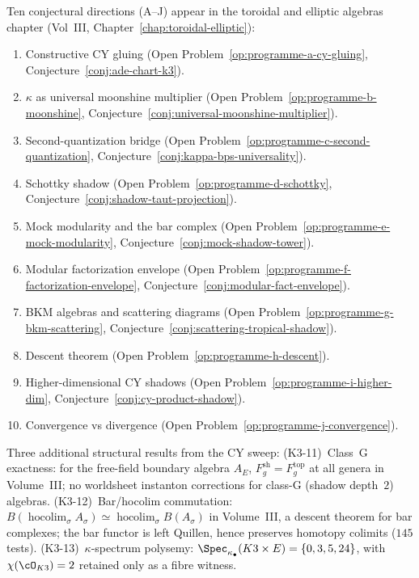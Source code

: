 \begin{enumerate}[resume, label=\textup{(\arabic*)}]
 Ten conjectural directions (A--J) appear in the toroidal and
 elliptic algebras chapter
 (Vol~III, Chapter~\ref{chap:toroidal-elliptic}):
 \begin{enumerate}[label=\textup{(\Alph*)}]
 \item Constructive CY gluing
 (Open Problem~\ref{op:programme-a-cy-gluing},
 Conjecture~\ref{conj:ade-chart-k3}).
 \item $\kappa$ as universal moonshine multiplier
 (Open Problem~\ref{op:programme-b-moonshine},
 Conjecture~\ref{conj:universal-moonshine-multiplier}).
 \item Second-quantization bridge
 (Open Problem~\ref{op:programme-c-second-quantization},
 Conjecture~\ref{conj:kappa-bps-universality}).
 \item Schottky shadow
 (Open Problem~\ref{op:programme-d-schottky},
 Conjecture~\ref{conj:shadow-taut-projection}).
 \item Mock modularity and the bar complex
 (Open Problem~\ref{op:programme-e-mock-modularity},
 Conjecture~\ref{conj:mock-shadow-tower}).
 \item Modular factorization envelope
 (Open Problem~\ref{op:programme-f-factorization-envelope},
 Conjecture~\ref{conj:modular-fact-envelope}).
 \item BKM algebras and scattering diagrams
 (Open Problem~\ref{op:programme-g-bkm-scattering},
 Conjecture~\ref{conj:scattering-tropical-shadow}).
 \item Descent theorem
 (Open Problem~\ref{op:programme-h-descent}).
 \item Higher-dimensional CY shadows
 (Open Problem~\ref{op:programme-i-higher-dim},
 Conjecture~\ref{conj:cy-product-shadow}).
 \item Convergence vs divergence
 (Open Problem~\ref{op:programme-j-convergence}).
 \end{enumerate}
 \end{enumerate}

 Three additional structural results from the CY sweep:
 (K3-11)~Class~G exactness: for the free-field boundary algebra $A_E$,
 $F_g^{\mathrm{sh}} = F_g^{\mathrm{top}}$ at all genera
 in Volume~III; no worldsheet
 instanton corrections for class-G (shadow depth~$2$) algebras.
 (K3-12)~Bar/hocolim commutation:
 $B(\operatorname{hocolim}_\sigma A_\sigma) \simeq
 \operatorname{hocolim}_\sigma B(A_\sigma)$
 in Volume~III, a descent theorem for bar
 complexes; the bar functor is left Quillen, hence preserves
 homotopy colimits ($145$ tests).
 (K3-13)~$\kappa$-spectrum polysemy:
 $\Spec_{\kappa_\bullet}(K3 \times E)
 = \{0, 3, 5, 24\}$, with $\chi(\cO_{K3})=2$ retained only as a
 fibre witness.

